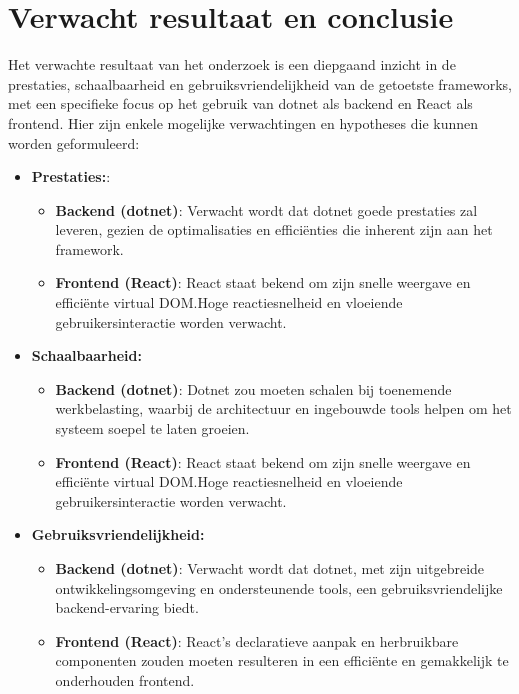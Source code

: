\documentclass{hogent-article}
\begin{document}
\section{Verwacht resultaat en conclusie}%
\label{sec:verwachte_resultaten}

Het verwachte resultaat van het onderzoek is een diepgaand inzicht in de prestaties, schaalbaarheid en gebruiksvriendelijkheid van de getoetste frameworks, met een specifieke focus op het gebruik van dotnet als backend en React als frontend. Hier zijn enkele mogelijke verwachtingen en hypotheses die kunnen worden geformuleerd:

\begin{itemize}
  \item \textbf{Prestaties:}:
    \begin{itemize}
      \item \textbf{Backend (dotnet)}: Verwacht wordt dat dotnet goede prestaties zal leveren, gezien de optimalisaties en efficiënties die inherent zijn aan het framework.
      \item \textbf{Frontend (React)}: React staat bekend om zijn snelle weergave en efficiënte virtual DOM.Hoge reactiesnelheid en vloeiende gebruikersinteractie worden verwacht.
    \end{itemize}
  \item \textbf{Schaalbaarheid:}
    \begin{itemize}
      \item \textbf{Backend (dotnet)}: Dotnet zou moeten schalen bij toenemende werkbelasting, waarbij de architectuur en ingebouwde tools helpen om het systeem soepel te laten groeien.
      \item \textbf{Frontend (React)}: React staat bekend om zijn snelle weergave en efficiënte virtual DOM.Hoge reactiesnelheid en vloeiende gebruikersinteractie worden verwacht.
    \end{itemize}
  \item \textbf{Gebruiksvriendelijkheid:}
    \begin{itemize}
      \item \textbf{Backend (dotnet)}: Verwacht wordt dat dotnet, met zijn uitgebreide ontwikkelingsomgeving en ondersteunende tools, een gebruiksvriendelijke backend-ervaring biedt.
      \item \textbf{Frontend (React)}: React's declaratieve aanpak en herbruikbare componenten zouden moeten resulteren in een efficiënte en gemakkelijk te onderhouden frontend.
    \end{itemize}
\end{itemize}
\end{document}
